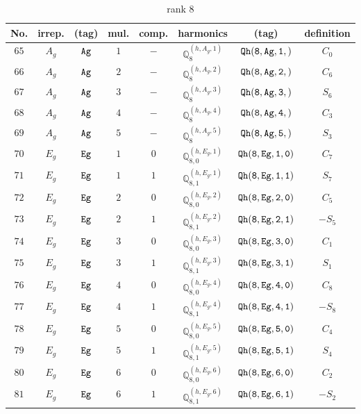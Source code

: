 \documentclass[fleqn,8pt]{jsarticle}
\begin{document}
\begin{table}[ht!]
\begin{center}
\caption{rank 8}
\renewcommand{\arraystretch}{1.3}
\begin{tabular}{cccccccc} \hline \hline
No. & irrep. & (tag) & mul. & comp. & harmonics & (tag) & definition \\ \hline
$ 65 $ & $ A_{g} $ & $ {\tt Ag} $ & $ 1 $ & $ - $ & $ \mathbb{Q}_{8}^{(h,A_{g},1)} $ & $ {\tt Qh(8,Ag,1,)} $ & $ C_{0} $ \\
$ 66 $ & $ A_{g} $ & $ {\tt Ag} $ & $ 2 $ & $ - $ & $ \mathbb{Q}_{8}^{(h,A_{g},2)} $ & $ {\tt Qh(8,Ag,2,)} $ & $ C_{6} $ \\
$ 67 $ & $ A_{g} $ & $ {\tt Ag} $ & $ 3 $ & $ - $ & $ \mathbb{Q}_{8}^{(h,A_{g},3)} $ & $ {\tt Qh(8,Ag,3,)} $ & $ S_{6} $ \\
$ 68 $ & $ A_{g} $ & $ {\tt Ag} $ & $ 4 $ & $ - $ & $ \mathbb{Q}_{8}^{(h,A_{g},4)} $ & $ {\tt Qh(8,Ag,4,)} $ & $ C_{3} $ \\
$ 69 $ & $ A_{g} $ & $ {\tt Ag} $ & $ 5 $ & $ - $ & $ \mathbb{Q}_{8}^{(h,A_{g},5)} $ & $ {\tt Qh(8,Ag,5,)} $ & $ S_{3} $ \\
$ 70 $ & $ E_{g} $ & $ {\tt Eg} $ & $ 1 $ & $ 0 $ & $ \mathbb{Q}_{8,0}^{(h,E_{g},1)} $ & $ {\tt Qh(8,Eg,1,0)} $ & $ C_{7} $ \\
$ 71 $ & $ E_{g} $ & $ {\tt Eg} $ & $ 1 $ & $ 1 $ & $ \mathbb{Q}_{8,1}^{(h,E_{g},1)} $ & $ {\tt Qh(8,Eg,1,1)} $ & $ S_{7} $ \\
$ 72 $ & $ E_{g} $ & $ {\tt Eg} $ & $ 2 $ & $ 0 $ & $ \mathbb{Q}_{8,0}^{(h,E_{g},2)} $ & $ {\tt Qh(8,Eg,2,0)} $ & $ C_{5} $ \\
$ 73 $ & $ E_{g} $ & $ {\tt Eg} $ & $ 2 $ & $ 1 $ & $ \mathbb{Q}_{8,1}^{(h,E_{g},2)} $ & $ {\tt Qh(8,Eg,2,1)} $ & $ - S_{5} $ \\
$ 74 $ & $ E_{g} $ & $ {\tt Eg} $ & $ 3 $ & $ 0 $ & $ \mathbb{Q}_{8,0}^{(h,E_{g},3)} $ & $ {\tt Qh(8,Eg,3,0)} $ & $ C_{1} $ \\
$ 75 $ & $ E_{g} $ & $ {\tt Eg} $ & $ 3 $ & $ 1 $ & $ \mathbb{Q}_{8,1}^{(h,E_{g},3)} $ & $ {\tt Qh(8,Eg,3,1)} $ & $ S_{1} $ \\
$ 76 $ & $ E_{g} $ & $ {\tt Eg} $ & $ 4 $ & $ 0 $ & $ \mathbb{Q}_{8,0}^{(h,E_{g},4)} $ & $ {\tt Qh(8,Eg,4,0)} $ & $ C_{8} $ \\
$ 77 $ & $ E_{g} $ & $ {\tt Eg} $ & $ 4 $ & $ 1 $ & $ \mathbb{Q}_{8,1}^{(h,E_{g},4)} $ & $ {\tt Qh(8,Eg,4,1)} $ & $ - S_{8} $ \\
$ 78 $ & $ E_{g} $ & $ {\tt Eg} $ & $ 5 $ & $ 0 $ & $ \mathbb{Q}_{8,0}^{(h,E_{g},5)} $ & $ {\tt Qh(8,Eg,5,0)} $ & $ C_{4} $ \\
$ 79 $ & $ E_{g} $ & $ {\tt Eg} $ & $ 5 $ & $ 1 $ & $ \mathbb{Q}_{8,1}^{(h,E_{g},5)} $ & $ {\tt Qh(8,Eg,5,1)} $ & $ S_{4} $ \\
$ 80 $ & $ E_{g} $ & $ {\tt Eg} $ & $ 6 $ & $ 0 $ & $ \mathbb{Q}_{8,0}^{(h,E_{g},6)} $ & $ {\tt Qh(8,Eg,6,0)} $ & $ C_{2} $ \\
$ 81 $ & $ E_{g} $ & $ {\tt Eg} $ & $ 6 $ & $ 1 $ & $ \mathbb{Q}_{8,1}^{(h,E_{g},6)} $ & $ {\tt Qh(8,Eg,6,1)} $ & $ - S_{2} $ \\
 \hline \hline
\end{tabular}
\end{center}
\end{table}
\end{document}
